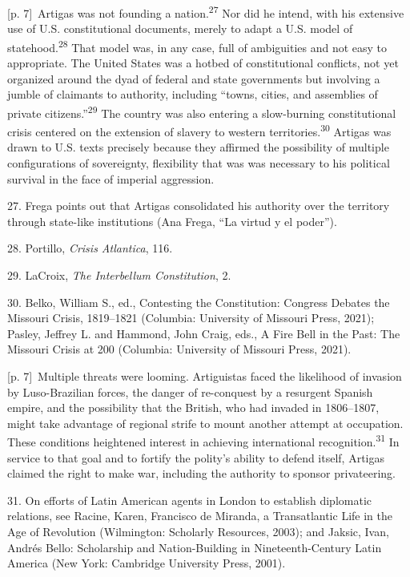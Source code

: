 \documentclass[10pt,a4paper]{article}
\begin{document}
{\scriptsize\color{gray} [p. 7]}\ Artigas was not founding a nation.\nobreak\textsuperscript{27} Nor did he intend, with his extensive use of U.S. constitutional documents, merely to adapt a U.S. model of statehood.\nobreak\textsuperscript{28} That model was, in any case, full of ambiguities and not easy to appropriate. The United States was a hotbed of constitutional conflicts, not yet organized around the dyad of federal and state governments but involving a jumble of claimants to authority, including “towns, cities, and assemblies of private citizens.”\nobreak\textsuperscript{29} The country was also entering a slow-burning constitutional crisis centered on the extension of slavery to western territories.\nobreak\textsuperscript{30} Artigas was drawn to U.S. texts precisely because they affirmed the possibility of multiple configurations of sovereignty, flexibility that was was necessary to his political survival in the face of imperial aggression.\par{\small 27. Frega points out that Artigas consolidated his authority over the territory through state-like institutions (Ana Frega, “La virtud y el poder”).\par}{\small 28. Portillo, \textit{Crisis Atlantica}, 116.\par}{\small 29. LaCroix, \textit{The Interbellum Constitution}, 2.\par}{\small 30. Belko, William S., ed., Contesting the Constitution: Congress Debates the Missouri Crisis, 1819–1821 (Columbia: University of Missouri Press, 2021); Pasley, Jeffrey L. and Hammond, John Craig, eds., A Fire Bell in the Past: The Missouri Crisis at 200 (Columbia: University of Missouri Press, 2021).\par}
{\scriptsize\color{gray} [p. 7]}\ Multiple threats were looming. Artiguistas faced the likelihood of invasion by Luso-Brazilian forces, the danger of re-conquest by a resurgent Spanish empire, and the possibility that the British, who had invaded in 1806–1807, might take advantage of regional strife to mount another attempt at occupation. These conditions heightened interest in achieving international recognition.\nobreak\textsuperscript{31} In service to that goal and to fortify the polity’s ability to defend itself, Artigas claimed the right to make war, including the authority to sponsor privateering.\par{\small 31. On efforts of Latin American agents in London to establish diplomatic relations, see Racine, Karen, Francisco de Miranda, a Transatlantic Life in the Age of Revolution (Wilmington: Scholarly Resources, 2003); and Jaksic, Ivan, Andrés Bello: Scholarship and Nation-Building in Nineteenth-Century Latin America (New York: Cambridge University Press, 2001).\par}
\end{document}
